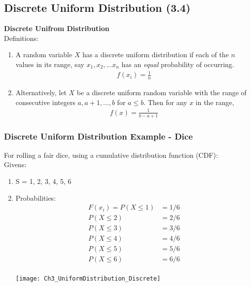\documentclass[../INDE315.tex]{subfiles}
\begin{document}
\subsection*{Discrete Uniform Distribution (3.4)}
\begin{defn}
    \textbf{Discrete Unifrom Distribution} \\
    Definitions:
    \begin{enumerate}
        \item A random variable $X$ has a discrete uniform distribution if each of the $n$ values in its range, say $x_1, x_2, ... x_n$ has an \emph{equal} probability of occurring.
            \begin{equation*}
                \begin{aligned}
                    f(x_i) = \frac{1}{n}
                \end{aligned}
            \end{equation*} 
        \item Alternatively, let $X$ be a discrete uniform random variable with the range of consecutive integers $a, a+1,...,b$ for $a \leq b$. Then for any $x$ in the range,
            \begin{equation*}
                \begin{aligned}
                    f(x) = \frac{1}{b - a + 1}
                \end{aligned}
            \end{equation*}
    \end{enumerate}
\end{defn}

\subsubsection*{Discrete Uniform Distribution Example - Dice}
For rolling a fair dice, using a cumulative distribution function (CDF): \\
Givens:
\begin{enumerate}
    \item S = {1, 2, 3, 4, 5, 6}
    \item Probabilities:
        \begin{equation*}
            \begin{aligned}
                F(x_i) = P(X \leq 1) &= 1/6 \\
                P(X \leq 2) &= 2/6  \\
                P(X \leq 3) &= 3/6 \\
                P(X \leq 4) &= 4/6 \\
                P(X \leq 5) &= 5/6 \\
                P(X \leq 6) &= 6/6 \\
            \end{aligned}
        \end{equation*}
        \begin{center}
            \texttt{[image: Ch3\_UniformDistribution\_Discrete]}
        \end{center}
\end{enumerate}
\end{document}

